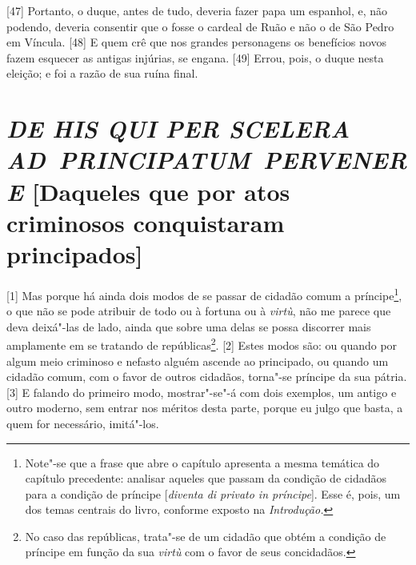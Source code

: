 \quebra

{[}47{]}
Portanto, o duque, antes de tudo, deveria fazer papa um espanhol, e, não
podendo, deveria consentir que o fosse o cardeal de Ruão e não o de São
Pedro em Víncula. {[}48{]} E quem crê que nos grandes personagens os 
benefícios novos fazem esquecer as antigas injúrias, se engana. {[}49{]}
Errou, pois, o duque nesta eleição; e foi a razão de sua ruína final.

\quebra\section{\emph{DE HIS QUI PER SCELERA AD~PRINCIPATUM~PERVENERE}\break
{[}Daqueles que por atos criminosos conquistaram principados{]}}

{[}1{]} Mas porque há ainda dois modos de se passar de cidadão comum a
príncipe\footnote{Note"-se que a frase que abre o capítulo apresenta a
  mesma temática do capítulo precedente: analisar aqueles que passam da
  condição de cidadãos para a condição de príncipe {[}\emph{diventa di
  privato in príncipe}{]}. Esse é, pois, um dos temas centrais do livro,
  conforme exposto na \emph{Introdução.}}, o que não se pode atribuir de
todo ou à fortuna ou à \emph{virtù}, não me parece que deva deixá"-las de
lado, ainda que sobre uma delas se possa discorrer mais amplamente em se
tratando de repúblicas\footnote{No caso das repúblicas, trata"-se de um
  cidadão que obtém a condição de príncipe em função da sua \emph{virtù}
  com o favor de seus concidadãos.}. {[}2{]} Estes modos são: ou quando
por algum meio criminoso e nefasto alguém ascende ao principado, ou
quando um cidadão comum, com o favor de outros cidadãos, torna"-se
príncipe da sua pátria. {[}3{]} E falando do primeiro modo, mostrar"-se"-á
com dois exemplos, um antigo e outro moderno, sem entrar nos méritos
desta parte, porque eu julgo que basta, a quem for necessário,
imitá"-los.


